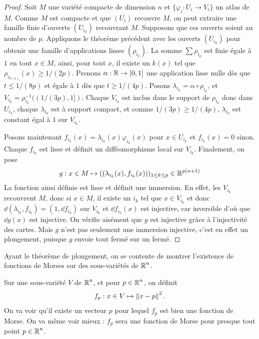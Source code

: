 \begin{proof}
    Soit $M$ une variété compacte de dimension $n$ et $\lbrace\varphi_i:U_i\to V_i\rbrace$ un atlas de $M$. 
    Comme $M$ est compacte et que $(U_i)$ recouvre $M$, on peut extraire une famille finie 
    d'ouverts $(U_{i_k})$ recouvrant $M$. 
    Supposons que ces ouverts soient au nombre de $p$.
    Appliquons le théorème précédent avec les ouverts $(U_{i_k})$ pour obtenir une famille 
    d'applications lisses $(\rho_{i_k})$.
    La somme $\sum\rho_{i_k}$ est finie égale à $1$ en tout $x\in M$, ainsi, pour tout $x$, 
    il existe un $k(x)$ tel que $\rho_{i_{k(x)}}(x)\geq1/(2p)$.
    Prenons $\alpha:\operatorname{\mathbb R}\to[0,1]$ une application lisse nulle dès que $t\leq 1/(8p)$ et égale 
    à $1$ dès que $t\geq 1/(4p)$.
    Posons $\lambda_{i_k}=\alpha\circ\rho_{i_k}$, et $V_{i_k}=\rho_{i_k}^{-1}((1/(3p),1])$.
    Chaque $V_{i_k}$ est inclus dans le support de $\rho_{i_k}$ donc dans $U_{i_k}$, chaque 
    $\lambda_{i_k}$ est à support compact, et comme $1/(3p)\geq1/(4p)$, $\lambda_{i_k}$ est 
    constant égal à $1$ sur $V_{i_k}$.


    Posons maintenant $f_{i_k}(x)=\lambda_{i_k}(x)\varphi_{i_k}(x)$ pour $x\in U_{i_k}$ et 
    $f_{i_k}(x)=0$ sinon.
    Chaque $f_{i_k}$ est lisse et définit un difféomorphisme local sur $V_{i_k}$. 
    Finalement, on pose 
    \[
        g:x\in M\mapsto ((\lambda_{i_k}(x),f_{i_k}(x)))_{1\leq k\leq p}\in\operatorname{\mathbb R}^{p(n+1)}
    \]
    La fonction ainsi définie est lisse et définit une immersion. 
    En effet, les $V_{i_k}$ recouvrent $M$, donc si $x\in M$, il existe un $i_k$ tel 
    que $x\in V_{i_k}$ et donc $\dd(\lambda_{i_k},f_{i_k})=(1,\dd f_{i_k})$ sur $V_{i_k}$ 
    et $\dd f_{i_k}(x)$ est injective, car inversible d'où que $\dd g(x)$ est injective. 
    On vérifie aisément que $g$ est injective grâce à l'injectivité des cartes.
    Mais $g$ n'est pas seulement une immersion injective, c'est en effet un plongement,
    puisque $g$ envoie tout fermé sur un fermé.
\end{proof}

Ayant le théorème de plongement, on se contente de montrer l'existence de fonctions de Morses 
sur des sous-variétés de $\operatorname{\mathbb R}^n$.

Sur une sous-variété $V$ de $\operatorname{\mathbb R}^n$, et pour $p\in\operatorname{\mathbb R}^n$, on définit 
\[
    f_p:x\in V\mapsto \left\lVert x-p\right\rVert^2.
\]
On va voir qu'il existe un vecteur $p$ pour lequel $f_p$ est bien une fonction de Morse. 
On va même voir mieux : $f_p$ sera une fonction de Morse pour presque tout point $p\in\operatorname{\mathbb R}^n$.

